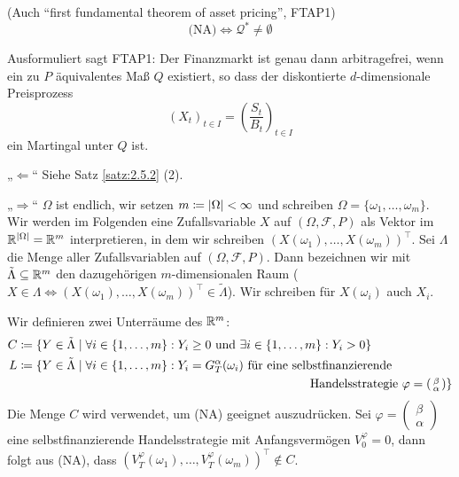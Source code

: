 \documentclass[a4paper,twoside,DIV15,BCOR12mm]{scrbook}
\newcommand{\cF}{\mathcal F}
\newcommand{\cQ}{\mathcal Q}
\begin{document}
\begin{satz}
(Auch “first fundamental theorem of asset pricing”, FTAP1)\label{satz:2.5.4}
\[
\text{(NA)} \iff \cQ^* \ne\emptyset
\]
\end{satz}

\begin{bemerkung}
Ausformuliert sagt FTAP1: Der Finanzmarkt ist genau dann arbitragefrei, wenn ein zu $P$ äquivalentes Maß $Q$ existiert, so dass der diskontierte $d$-dimensionale Preisprozess
\[
(X_t)_{t\in I} =\left( \frac{S_t}{B_t}\right)_{t\in I}
\]
ein Martingal unter $Q$ ist.
\end{bemerkung}

\begin{beweis}
„$\Longleftarrow$“ Siehe Satz \ref{satz:2.5.2} (2).

„$\Longrightarrow$“ $\Omega$ ist endlich, wir setzen $m\da |\Omega|<\infty$ und schreiben $\Omega = \{\omega_1,\ldots, \omega_m\}$. Wir werden im Folgenden eine Zufallsvariable $X$ auf $(\Omega,\cF, P)$ als Vektor im $\mathbb{R}^{|\Omega|} =\mathbb{R}^m$ interpretieren, in dem wir schreiben $(X(\omega_1),\ldots,X(\omega_m))^\top$. Sei $\Lambda$ die Menge aller Zufallsvariablen auf $(\Omega,\cF, P)$. Dann bezeichnen wir mit $\tilde\Lambda\subseteq \mathbb{R}^m$ den dazugehörigen $m$-dimensionalen Raum ($X\in\Lambda\iff (X(\omega_1),\ldots,X(\omega_m))^\top\in \tilde\Lambda$). Wir schreiben für $X(\omega_i)$ auch $X_i$.

Wir definieren zwei Unterräume des $\mathbb{R}^m$:
\begin{align*}
C &\da \{ Y\in \tilde\Lambda\mid \forall i\in\{1,\ldots,m\}: Y_i \ge 0 \text{ und } \exists i\in\{1,\ldots,m\}: Y_i > 0\} \\
L &\da \{ Y\in \tilde\Lambda\mid \forall i\in\{1,\ldots,m\}: Y_i = G_T^\alpha(\omega_i) \text{ für eine selbstfinanzierende} \\
&\hspace{24em}\text{Handelsstrategie } 
\varphi=\left(\begin{smallmatrix} \beta \\ \alpha \end{smallmatrix}\right)\}
\end{align*}
Die Menge $C$ wird verwendet, um (NA) geeignet auszudrücken. Sei 
$\varphi=\left(\begin{smallmatrix} \beta \\ \alpha \end{smallmatrix}\right)$
eine selbstfinanzierende Handelsstrategie mit Anfangsvermögen $V_0^\varphi = 0$, dann folgt aus (NA), dass $(V_T^\varphi(\omega_1),\ldots, V_T^\varphi(\omega_m))^\top\notin C$.


\end{beweis}
\end{document}
